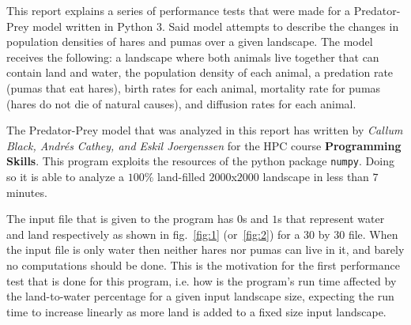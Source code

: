 \documentclass[12pt,a4paper]{article}
\begin{document}
This report explains a series of performance tests that were made for a 
Predator-Prey model written in Python 3. Said model attempts to describe the 
changes in population densities of hares and pumas over a given landscape. The 
model receives the 
following: a landscape where both animals live together that can contain land 
and water, the population density of each animal, a predation rate (pumas that 
eat hares), birth rates for each animal, mortality rate for pumas (hares do not 
die of natural causes), and diffusion rates for each animal. 

The Predator-Prey model that was analyzed in this report has written by 
\textit{Callum Black, Andr\'es Cathey, and Eskil Joergenssen} for the HPC 
course \textbf{Programming Skills}. This program exploits the resources of the 
python package \texttt{numpy}. Doing so it is able to analyze a $100\%$ 
land-filled 
$2000$x$2000$ landscape in less than $7$ minutes. 

The input file that is given to the program has $0$s and $1$s that represent 
water and land respectively as shown in fig.~\ref{fig:1} (or~\ref{fig:2}) for a 
$30$ by $30$ 
file. When the input file is only water then neither hares nor pumas can live in 
it, and barely no computations should be done. This is the motivation for the 
first performance test that is done for this program, i.e. how is the 
program's run time affected by the land-to-water percentage for a given input 
landscape size, expecting the run time to increase linearly as more land is 
added to a fixed size input landscape.
\end{document}
